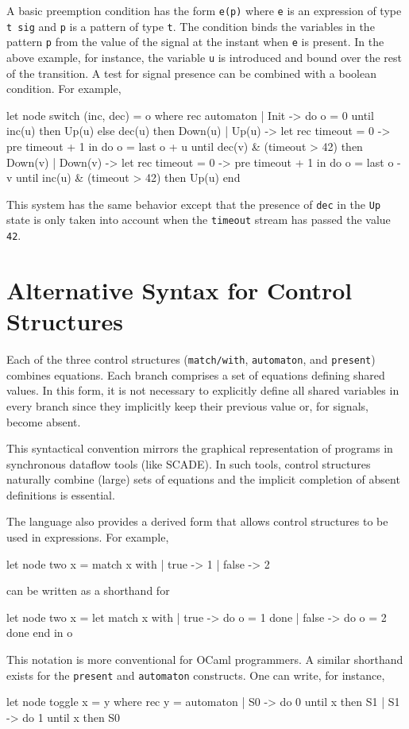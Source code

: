 \documentclass[11pt,titlepage,twoside]{report}
\makeatletter
\newcommand{\zls}[1]{{\@span{class="zelusinline"}#1}}
\newcommand{\zls}[1]{\texttt{#1}}
\renewcommand{\zls}[1]{\texttt{#1}}
\newcommand{\scade}{{\sf SCADE}}
\newcommand{\ocaml}{{\sf OCaml}}
\makeatother
\begin{document}
A basic preemption condition has the form \zls{e(p)} where \zls{e} is an 
expression of type \zls{t sig} and \zls{p} is a pattern of type \zls{t}.
The condition binds the variables in the pattern \zls{p} from the value of the 
signal at the instant when \zls{e} is present.
In the above example, for instance, the variable \zls{u} is introduced and 
bound over the rest of the transition.
A test for signal presence can be combined with a boolean condition.
For example,
\begin{chklisting}[withresult]
let node switch (inc, dec) = o where
  rec automaton
  | Init ->
      do o = 0
      until inc(u) then Up(u)
       else dec(u) then Down(u)
  | Up(u) ->
      let rec timeout = 0 -> pre timeout + 1 in
      do o = last o + u
      until dec(v) & (timeout > 42) then Down(v)
  | Down(v) ->
      let rec timeout = 0 -> pre timeout + 1 in
      do o = last o - v
      until inc(u) & (timeout > 42) then Up(u)
  end
\end{chklisting}
This system has the same behavior except that the presence of
\zls{dec} in the \zls{Up} state is only taken into account when the
\zls{timeout} stream has passed the value \zls{42}.

\section{Alternative Syntax for Control Structures\label{altcontrol}} %

Each of the three control structures (\zls{match/with},
\zls{automaton}, and \zls{present}) combines equations. Each branch comprises
a set of equations defining shared values. In this form, it
is not necessary to explicitly define all shared variables in every branch
since they implicitly keep their previous value or, for signals, become absent.

This syntactical convention mirrors the graphical representation of programs in 
synchronous dataflow tools (like \scade). In such tools, control structures 
naturally combine (large) sets of equations and the implicit completion of 
absent definitions is essential.

The language also provides a derived form that allows control structures
to be used in expressions. For example,
%
\begin{chklisting}
let node two x =
  match x with | true -> 1 | false -> 2
\end{chklisting}
%
can be written as a shorthand for
\begin{chklisting}
let node two x =
  let match x with
     |  true -> do o = 1 done
     | false -> do o = 2 done
     end in
  o
\end{chklisting}
%
This notation is more conventional for \ocaml{} programmers.
A similar shorthand exists for the \zls{present} and \zls{automaton}
constructs.
One can write, for instance,
\begin{chklisting}
let node toggle x = y where
  rec y =
    automaton
    | S0 -> do 0 until x then S1
    | S1 -> do 1 until x then S0
\end{chklisting}
\end{document}
